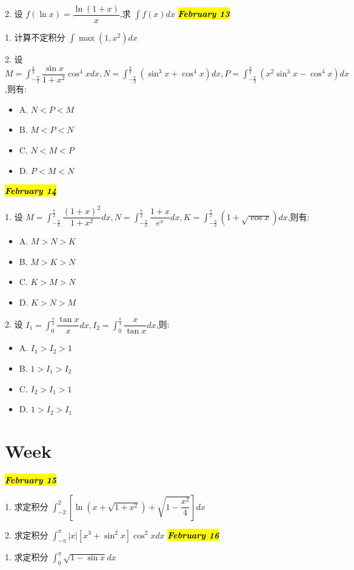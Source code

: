 2. 设 $f(\ln x)=\dfrac{\ln(1+x)}{x}$,求 $\int f(x)dx$
\hl{\textbf{\textit{February 13}}}

1. 计算不定积分 $\int \max(1,x^{2})dx$

2. 设 $M=\int_{-\frac{\pi}{2}}^{\frac{\pi}{2}}\dfrac{\sin x}{1+x^{2}}\cos^{4}xdx,N=\int_{-\frac{\pi}{2}}^{\frac{\pi}{2}}(\sin^{3}x+\cos^{4}x)dx,P=\int_{-\frac{\pi}{2}}^{\frac{\pi}{2}}(x^{2}\sin^{3}x-\cos^{4}x)dx$,则有: 
\begin{itemize}
	\item A. $N<P<M$
	\item B. $M<P<N$
	\item C. $N<M<P$
	\item D. $P<M<N$
\end{itemize}
\hl{\textbf{\textit{February 14}}}

1. 设 $M=\int_{-\frac{\pi}{2}}^{\frac{\pi}{2}}\dfrac{(1+x)^{2}}{1+x^{2}}dx,N=\int_{-\frac{\pi}{2}}^{\frac{\pi}{2}}\dfrac{1+x}{e^{x}}dx,K=\int_{-\frac{\pi}{2}}^{\frac{\pi}{2}}(1+\sqrt{\cos x})dx$,则有: 
\begin{itemize}
	\item A. $M>N>K$
	\item B. $M>K>N$
	\item C. $K>M>N$
	\item D. $K>N>M$
\end{itemize}

2. 设 $I_{1}=\int_{0}^{\frac{\pi}{4}}\dfrac{\tan x}{x}dx,I_{2}=\int_{0}^{\frac{\pi}{4}}\dfrac{x}{\tan x}dx$,则:
\begin{itemize}
	\item A. $I_{1}>I_{2}>1$
	\item B. $1>I_{1}>I_{2}$
	\item C. $I_{2}>I_{1}>1$
	\item D. $1>I_{2}>I_{1}$
\end{itemize}
\section{Week }
\hl{\textbf{\textit{February 15}}}

1. 求定积分 $\int_{-2}^{2}[\ln(x+\sqrt{1+x^{2}})+\sqrt{1-\dfrac{x^{2}}{4}}]dx$

2. 求定积分 $\int_{-\pi}^{\pi}|x|[x^{3}+\sin^{2}x]\cos^{2}xdx$
\hl{\textbf{\textit{February 16}}}

1. 求定积分 $\int_{0}^{\pi}\sqrt{1-\sin x}dx$

